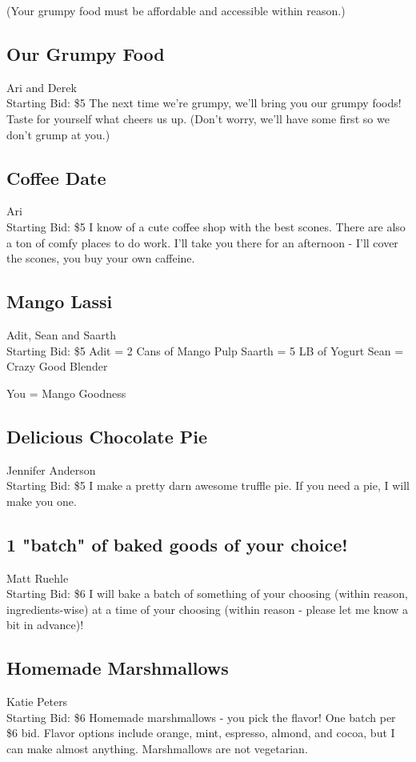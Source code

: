 \documentclass[11pt]{article}
\begin{document}
(Your grumpy food must be affordable and accessible within reason.)
\subsection{Our Grumpy Food}
Ari and Derek
\\
Starting Bid: \$5
\newline
The next time we're grumpy, we'll bring you our grumpy foods! Taste for yourself what cheers us up. (Don't worry, we'll have some first so we don't grump at you.)
\subsection{Coffee Date}
Ari
\\
Starting Bid: \$5
\newline
I know of a cute coffee shop with the best scones. There are also a ton of comfy places to do work. I'll take you there for an afternoon - I'll cover the scones, you buy your own caffeine.
\subsection{Mango Lassi}
Adit, Sean and Saarth
\\
Starting Bid: \$5
\newline
Adit = 2 Cans of Mango Pulp
Saarth = 5 LB of Yogurt
Sean = Crazy Good Blender

You = Mango Goodness
\subsection{Delicious Chocolate Pie}
Jennifer Anderson
\\
Starting Bid: \$5
\newline
I make a pretty darn awesome truffle pie. If you need a pie, I will make you one.
\subsection{1 "batch" of baked goods of your choice!}
Matt Ruehle
\\
Starting Bid: \$6
\newline
I will bake a batch of something of your choosing (within reason, ingredients-wise) at a time of your choosing (within reason - please let me know a bit in advance)!
\subsection{Homemade Marshmallows}
Katie Peters
\\
Starting Bid: \$6
\newline
Homemade marshmallows - you pick the flavor! One batch per \$6 bid. Flavor options include orange, mint, espresso, almond, and cocoa, but I can make almost anything. Marshmallows are not vegetarian.
\end{document}
